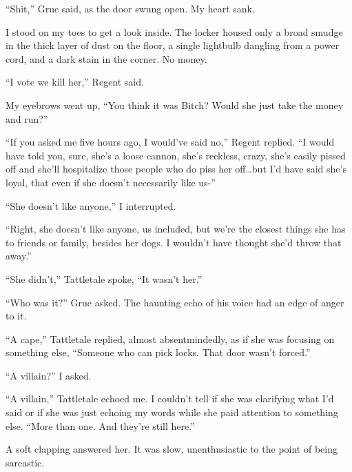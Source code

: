 ``Shit,'' Grue said, as the door swung open.  My heart sank.



I stood on my toes to get a look inside.  The locker housed only a broad smudge in the thick layer of dust on the floor, a single lightbulb dangling from a power cord, and a dark stain in the corner.  No money.



``I vote we kill her,'' Regent said.



My eyebrows went up, ``You think it was Bitch?  Would she just take the money and run?''



``If you asked me five hours ago, I would've said no,'' Regent replied.  ``I would have told you, sure, she's a loose cannon, she's reckless, crazy, she's easily pissed off and she'll hospitalize those people who do piss her off\ldots but I'd have said she's loyal, that even if she doesn't necessarily like us-''



``She doesn't like anyone,'' I interrupted.



``Right, she doesn't like anyone, us included, but we're the closest things she has to friends or family, besides her dogs.  I wouldn't have thought she'd throw that away.''



``She didn't,'' Tattletale spoke, ``It wasn't her.''



``Who was it?'' Grue asked.  The haunting echo of his voice had an edge of anger to it.



``A cape,'' Tattletale replied, almost absentmindedly, as if she was focusing on something else, ``Someone who can pick locks.  That door wasn't forced.''



``A villain?'' I asked.



``A villain,'' Tattletale echoed me.  I couldn't tell if she was clarifying what I'd said or if she was just echoing my words while she paid attention to something else.  ``More than one.  And they're still here.''



A soft clapping answered her.  It was slow, unenthusiastic to the point of being sarcastic.



